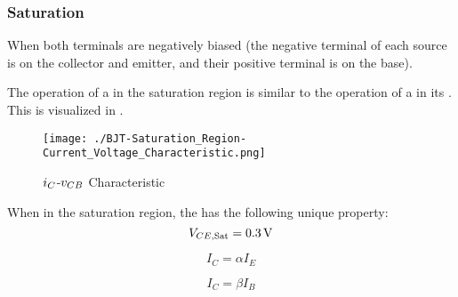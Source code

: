 \subsubsection{Saturation}\label{subsubsec:BJT_Saturation_Region}
When both terminals are negatively biased (the negative terminal of each source is on the collector and emitter, and their positive terminal is on the base).

\begin{remark*}
  The operation of a  in the saturation region is similar to the operation of a  in its .
  This is visualized in .
\end{remark*}

\begin{figure}[h!tbp]
  \centering
  \texttt{[image: ./BJT-Saturation\_Region-Current\_Voltage\_Characteristic.png]}
  \caption{$i_{C}$-$v_{CB}$ Characteristic \parencite[p.~317]{sedraTextbook7}}
  \label{fig:BJT-Saturation_Region-Current_Voltage_Characteristic}
\end{figure}

When in the saturation region, the  has the following unique property:
\begin{equation}\label{eq:BJT_Collector_Emitter_Saturation_Voltage}
  V_{CE, \mathrm{Sat}} = \SI{0.3}{\volt}
\end{equation}

\begin{equation}\label{eq:BJT_Alpha}
  I_{C} = \alpha I_{E}
\end{equation}


\begin{equation}\label{eq:BJT_Beta}
  I_{C} = \beta I_{B}
\end{equation}


